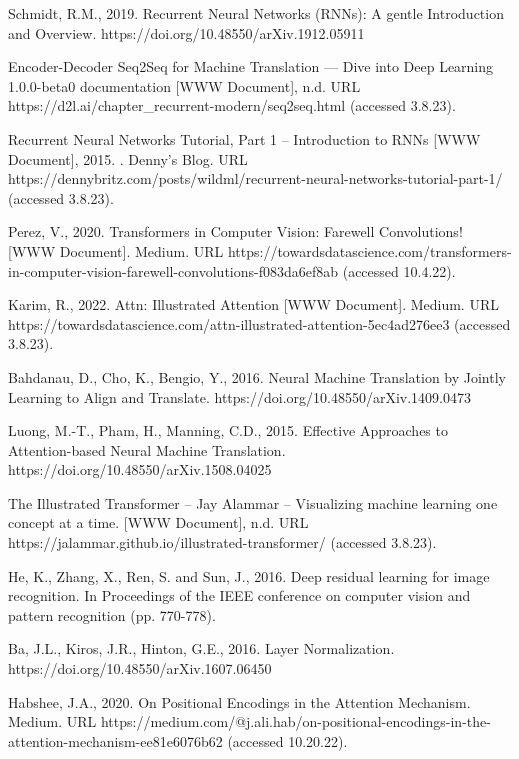\begin{thebibliography}{ widest-label }
	Schmidt, R.M., 2019. Recurrent Neural Networks (RNNs): A gentle Introduction and Overview. https://doi.org/10.48550/arXiv.1912.05911

	
	Encoder-Decoder Seq2Seq for Machine Translation — Dive into Deep Learning 1.0.0-beta0 documentation [WWW Document], n.d. URL https://d2l.ai/chapter\_recurrent-modern/seq2seq.html (accessed 3.8.23).

	
Recurrent Neural Networks Tutorial, Part 1 – Introduction to RNNs [WWW Document], 2015. . Denny’s Blog. URL https://dennybritz.com/posts/wildml/recurrent-neural-networks-tutorial-part-1/ (accessed 3.8.23).

	
	Perez, V., 2020. Transformers in Computer Vision: Farewell Convolutions! [WWW Document]. Medium. URL https://towardsdatascience.com/transformers-in-computer-vision-farewell-convolutions-f083da6ef8ab (accessed 10.4.22).

	
Karim, R., 2022. Attn: Illustrated Attention [WWW Document]. Medium. URL https://towardsdatascience.com/attn-illustrated-attention-5ec4ad276ee3 (accessed 3.8.23).

	
	Bahdanau, D., Cho, K., Bengio, Y., 2016. Neural Machine Translation by Jointly Learning to Align and Translate. https://doi.org/10.48550/arXiv.1409.0473
	
	Luong, M.-T., Pham, H., Manning, C.D., 2015. Effective Approaches to Attention-based Neural Machine Translation. https://doi.org/10.48550/arXiv.1508.04025
	
The Illustrated Transformer – Jay Alammar – Visualizing machine learning one concept at a time. [WWW Document], n.d. URL https://jalammar.github.io/illustrated-transformer/ (accessed 3.8.23).

	
	He, K., Zhang, X., Ren, S. and Sun, J., 2016. Deep residual learning for image recognition. In Proceedings of the IEEE conference on computer vision and pattern recognition (pp. 770-778).
	
	Ba, J.L., Kiros, J.R., Hinton, G.E., 2016. Layer Normalization. https://doi.org/10.48550/arXiv.1607.06450
	
	Habshee, J.A., 2020. On Positional Encodings in the Attention Mechanism. Medium. URL https://medium.com/@j.ali.hab/on-positional-encodings-in-the-attention-mechanism-ee81e6076b62 (accessed 10.20.22).
	

\end{thebibliography}
